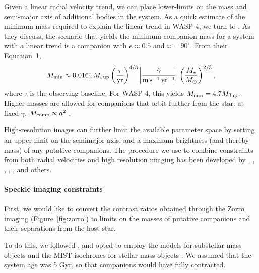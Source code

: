 \documentclass[12pt,twocolumn,tighten]{aastex62}
\begin{document}
Given a linear radial velocity trend, we can place lower-limits on the
mass and semi-major axis of additional bodies in the system.  As a
quick estimate of the minimum mass required to explain the linear
trend in WASP-4, we turn to \citet{feng_california_2015}.  As they
discuss, the scenario that yields the minimum companion mass for a
system with a linear trend is a companion with $e\approx0.5$ and
$\omega=90^\circ$.  From their Equation~1,
\begin{equation}
 M_{\rm min} \approx 0.0164\,M_{\rm Jup}
  \left( \frac{\tau}{{\rm yr}} \right)^{4/3}
  \left| \frac{\dot{\gamma}}{{\rm m\,s^{-1}\,yr^{-1}}} \right|
  \left( \frac{M_\star}{{M_\odot}} \right)^{2/3},
\end{equation}
where $\tau$ is the observing baseline.
For WASP-4, this yields $M_{\rm min} = 4.7 M_{\rm Jup}$.  Higher masses
are allowed for companions that orbit further from the
star: at fixed $\dot{\gamma}$, $M_{\rm comp} \propto a^2$
\citep{torres_substellar_1999,liu_crossing_2002}.

High-resolution images can further limit the available parameter space
by setting an upper limit on the semimajor axis, and a maximum
brightness (and thereby mass) of any putative companions.
The procedure we use to combine constraints from both radial
velocities and high resolution imaging has been developed by
\citet{wright_linear_trends_2007}, \citet{crepp_trends_2012},
\citet{montet_trends_2014}, \citet{knutson_friends_2014},
\citet{bryan_statistics_2016,bryan_excess_2019}, and others.

\paragraph{Speckle imaging constraints}

First, we would like to convert the contrast ratios obtained through
the Zorro imaging (Figure~\ref{fig:zorro}) to limits on the masses of
putative companions and their separations from the host star.

To do this, we followed \citet{montet_trends_2014}, and opted to
employ the \citet{baraffe_evolutionary_2003} models for substellar
mass objects and the MIST isochrones for stellar mass objects
\citep{paxton_modules_2011,paxton_modules_2013,paxton_modules_2015,dotter_mesa_2016,choi_mesa_2016}.
We assumed that the system age was 5 Gyr, so that companions would
have fully contracted.
\end{document}
